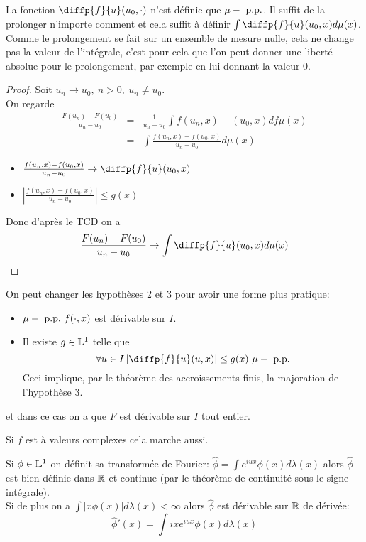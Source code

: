 \begin{remarque}
	La fonction $\diffp{f}{u}(u_0,\cdot)$ n'est définie que $\mu-\text{ p.p.}$. Il suffit de
	la prolonger n'importe comment et cela suffit à définir $\int \diffp{f}{u}(u_0,x)d\mu(x)$.
	Comme le prolongement se fait sur un ensemble de mesure nulle, cela ne change pas la valeur de l'intégrale,
	c'est pour cela que l'on peut donner une liberté absolue pour le prolongement, par exemple en lui donnant la valeur 0.
\end{remarque}

\begin{proof}
	Soit $u_n \to u_0, \ n > 0, \ u_n \neq u_0$. \\
	On regarde
	\begin{eqnarray*}
		\frac{F(u_n)-F(u_0)}{u_n-u_0} &=& \frac{1}{u_n-u_0} \int f(u_n,x) -(u_0,x)df\mu(x) \\
		&=& \int \frac{f(u_n,x) - f(u_0,x)}{u_n-u_0}d\mu(x)
	\end{eqnarray*}
	\begin{itemize}
		\item $\frac{f(u_n,x)- f(u_0,x)}{u_n-u_0} \to \diffp{f}{u}(u_0,x)$
		\item $\left|\frac{f(u_n,x)- f(u_0,x)}{u_n-u_0} \right| \leq g(x)$
	\end{itemize}
	Donc d'après le TCD on a %
	$$ \frac{F(u_n)- F(u_0)}{u_n-u_0} \to \int \diffp{f}{u}(u_0,x) d\mu(x)$$

\end{proof}

\begin{remarque}
	On peut changer les hypothèses 2 et 3 pour avoir une forme plus pratique:
	\begin{itemize}
		\item $\mu-\text{ p.p.}\  f(\cdot, x)$ est dérivable sur $I$.
		\item Il existe $g\in \mathbb{L}^1$ telle que
		      $$ \forall u\in I \left|\diffp{f}{u}(u,x)\right| \leq g(x) \ \mupp$$
		      Ceci implique, par le théorème des accroissements finis, la majoration de l'hypothèse 3.
	\end{itemize}
	et dans ce cas on a que $F$ est dérivable sur $I$ tout entier.
\end{remarque}

\begin{remarque}
	Si $f$ est à valeurs complexes cela marche aussi.
\end{remarque}


\begin{example}
	Si $\phi \in \mathbb{L}^1$ on définit sa transformée de Fourier:
	$\hat{\phi} = \int e^{iux}\phi(x) d\lambda(x)$
	alors $\hat{\phi}$ est bien définie dans $\mathbb{R}$ et continue (par le théorème de continuité sous le signe intégrale).\\
	Si de plus on a $\int |x\phi(x)|d\lambda(x)<\infty$ alors $\hat{\phi}$ est dérivable sur $\mathbb{R}$ de dérivée:
	$$\hat{\phi}'(x)= \int ixe^{iux}\phi(x)d\lambda(x)$$
\end{example}



